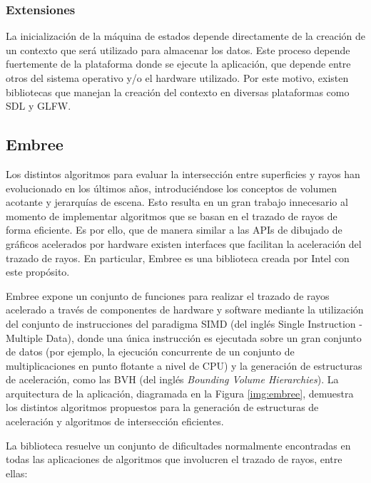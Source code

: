 \subsubsection{Extensiones}
La inicialización de la máquina de estados depende directamente de la creación de un contexto que será utilizado para almacenar los datos. Este proceso depende fuertemente de la plataforma donde se ejecute la aplicación, que depende entre otros del sistema operativo y/o el hardware utilizado. Por este motivo, existen bibliotecas que manejan la creación del contexto en diversas plataformas como SDL y GLFW.
	
\subsection{Embree}

Los distintos algoritmos para evaluar la intersección entre superficies y rayos han evolucionado en los últimos años, introduciéndose los conceptos de volumen acotante y jerarquías de escena. Esto resulta en un gran trabajo innecesario al momento de implementar algoritmos que se basan en el trazado de rayos de forma eficiente. Es por ello, que de manera similar a las APIs de dibujado de gráficos acelerados por hardware existen interfaces que facilitan la aceleración del trazado de rayos. En particular, Embree es una biblioteca creada por Intel con este propósito.

Embree expone un conjunto de funciones para realizar el trazado de rayos acelerado a través de componentes de hardware y software mediante la utilización del conjunto de instrucciones del paradigma SIMD (del inglés Single Instruction - Multiple Data), donde una única instrucción es ejecutada sobre un gran conjunto de datos (por ejemplo, la ejecución concurrente de un conjunto de multiplicaciones en punto flotante a nivel de CPU) y la generación de estructuras de aceleración, como las BVH (del inglés \textit{Bounding Volume Hierarchies}). La arquitectura de la aplicación, diagramada en la Figura \ref{img:embree}, demuestra los distintos algoritmos propuestos para la generación de estructuras de aceleración y algoritmos de intersección eficientes.

La biblioteca resuelve un conjunto de dificultades normalmente encontradas en todas las aplicaciones de algoritmos que involucren el trazado de rayos, entre ellas:

